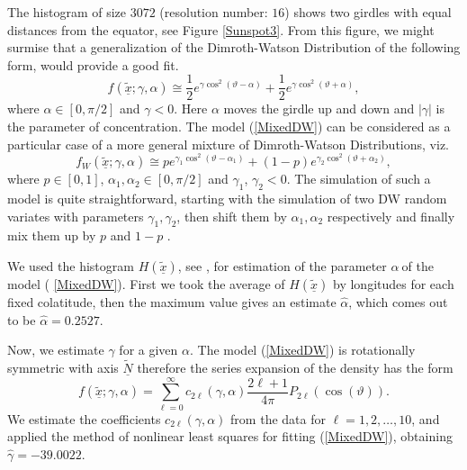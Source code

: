 \documentclass[preprint,11pt,a4paper]{elsarticle}
\begin{document}
The histogram of size $3072$ (resolution number: $16$) shows two girdles
with equal distances from the equator, see Figure \ref{Sunspot3}. From this
figure, we might surmise that a generalization of the Dimroth-Watson
Distribution of the following form, would provide a good fit. 
\begin{equation}
f\left( \underline{\widetilde{x}};\gamma,\alpha\right) \cong\frac{1}{2}%
e^{\gamma\cos^{2}\left( \vartheta-\alpha\right) }+\frac{1}{2}%
e^{\gamma\cos^{2}\left( \vartheta+\alpha\right) },  \label{MixedDW}
\end{equation}
where $\alpha\in\left[ 0,\pi/2\right] $ and $\gamma<0$. Here $\alpha$ moves
the girdle up and down and $\left\vert \gamma\right\vert $ is the parameter
of concentration. The model (\ref{MixedDW}) can be considered as a
particular case of a more general mixture of Dimroth-Watson Distributions,
viz.%
\begin{equation*}
f_{W}\left( \underline{\widetilde{x}};\gamma,\alpha\right) \cong
pe^{\gamma_{1}\cos^{2}\left( \vartheta-\alpha_{1}\right) }+\left( 1-p\right)
e^{\gamma_{2}\cos^{2}\left( \vartheta+\alpha_{2}\right) },
\end{equation*}
where $p\in\left[ 0,1\right] $, $\alpha_{1},\alpha_{2}\in\left[ 0,\pi/2%
\right] $ and $\gamma_{1}$, $\gamma_{2}<0$. The simulation of such a model
is quite straightforward, starting with the simulation of two DW random
variates with parameters $\gamma_{1},\gamma_{2}$, then shift them by $%
\alpha_{1},\alpha_{2}$ respectively and finally mix them up by $p$ and $1-p $%
.

We used the histogram $H\left( \widetilde{\underline{x}}\right) $, see \cite%
{TGy_RSJ_WB2017}, for estimation of the parameter $\alpha\ $of the model (%
\ref{MixedDW}). First we took the average of $H\left( \widetilde{\underline{x%
}}\right) $ by longitudes for each fixed colatitude, then the maximum value
gives an estimate $\widehat{\alpha}$, which comes out to be $\widehat{\alpha}%
=0.2527$.

Now, we estimate $\gamma$ for a given $\alpha$. The model (\ref{MixedDW}) is
rotationally symmetric with axis $\underline{\widetilde{N}}$ therefore the
series expansion of the density has the form 
\begin{equation*}
f\left( \underline{\widetilde{x}};\gamma,\alpha\right) =\sum_{\ell
=0}^{\infty}c_{2\ell}\left( \gamma,\alpha\right) \frac{2\ell+1}{4\pi }%
P_{2\ell}\left( \cos\left( \vartheta\right) \right) .
\end{equation*}
We estimate the coefficients $c_{2\ell}\left( \gamma,\alpha\right) $ from
the data for $\ell=1,2,\ldots,10$, and applied the method of nonlinear least
squares for fitting (\ref{MixedDW}), obtaining $\widehat{\gamma}=-39.0022$.
\end{document}
